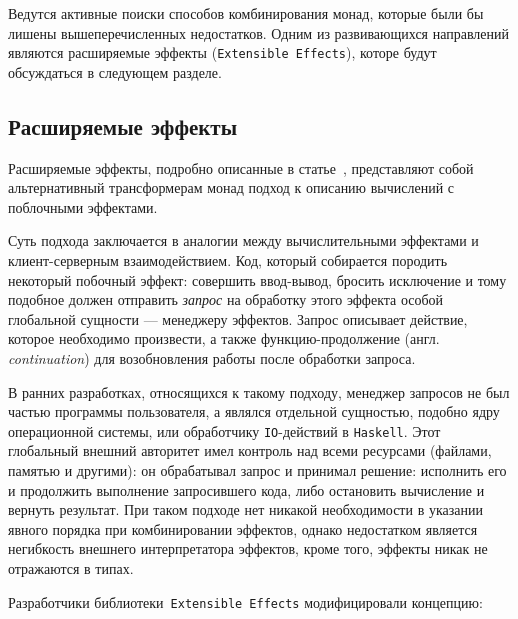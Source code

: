     Ведутся активные поиски способов комбинирования монад, которые были бы лишены
    вышеперечисленных недостатков. Одним из развивающихся направлений являются
    расширяемые эффекты (\lstinline{Extensible Effects}), которе будут обсуждаться
    в следующем разделе.

  \subsection{Расширяемые эффекты}

    Расширяемые эффекты, подробно описанные в статье~\cite{extEffects}, представляют
    собой альтернативный трансформерам монад подход к описанию вычислений с поблочными
    эффектами.

    Суть подхода заключается в аналогии между вычислительными эффектами и
    клиент-серверным взаимодействием. Код, который собирается породить некоторый
    побочный эффект: совершить ввод-вывод, бросить исключение и тому подобное должен
    отправить \emph{запрос} на обработку этого эффекта особой глобальной сущности
    --- менеджеру эффектов. Запрос описывает действие, которое необходимо
    произвести, а также функцию-продолжение (англ. \emph{continuation}) для
    возобновления работы после обработки запроса.

    В ранних разработках, относящихся к такому подходу, менеджер запросов не был
    частью программы пользователя, а являлся отдельной сущностью, подобно ядру
    операционной системы, или обработчику \lstinline{IO}-действий в
    \lstinline{Haskell}. Этот глобальный внешний авторитет имел контроль над всеми
    ресурсами (файлами, памятью и другими): он обрабатывал запрос и принимал решение:
    исполнить его и продолжить выполнение запросившего кода, либо остановить
    вычисление и вернуть результат. При таком подходе нет никакой необходимости в
    указании явного порядка при комбинировании эффектов, однако недостатком является
    негибкость внешнего интерпретатора эффектов, кроме того, эффекты никак
    не отражаются в типах.

    Разработчики библиотеки~\lstinline{Extensible Effects} модифицировали концепцию:

